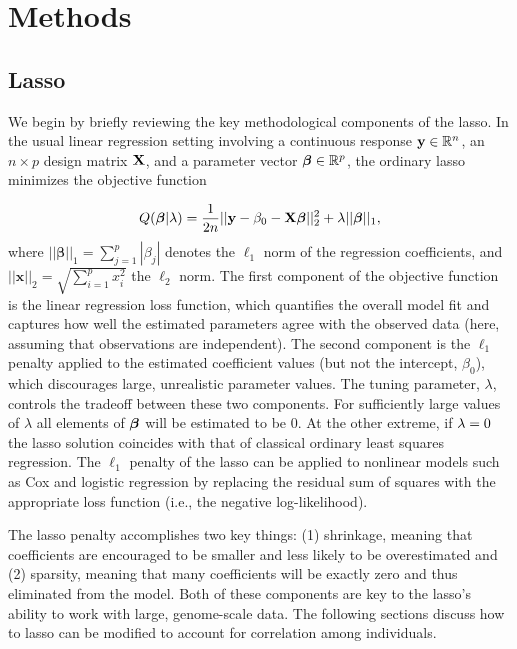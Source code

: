\section{Methods} \label{sec:methods}
\subsection{Lasso}
We begin by briefly reviewing the key methodological components of the lasso. In the usual linear regression setting involving a continuous response $\mathbf{y} \in \mathbb{R}^n$, an $n \times p$ design matrix $\mathbf{X}$, and a parameter vector $\boldsymbol{\beta}{} \in \mathbb{R}^p$, the ordinary lasso minimizes the objective function

\begin{equation}
    Q(\boldsymbol{\beta}{} | \lambda) = \frac{1}{2n}|| \mathbf{y} -  \beta_0 - \mathbf{X} \boldsymbol{\beta}{} ||_2^2 + \lambda ||\boldsymbol{\beta}{}||_1,
\end{equation}
where $|| \boldsymbol{\beta} ||_1 = \sum_{j=1}^p |\beta_j|$ denotes the $\ell_1$ norm of the regression coefficients, and $||\mathbf{x}||_2 = \sqrt{\sum_{i=1}^p x_i^2}$ the $\ell_2$ norm. The first component of the objective function is the linear regression loss function, which quantifies the overall model fit and captures how well the estimated parameters agree with the observed data (here, assuming that observations are independent). The second component is the $\ell_1$ penalty applied to the estimated coefficient values (but not the intercept, $\beta_0$), which discourages large, unrealistic parameter values. The tuning parameter, $\lambda$, controls the tradeoff between these two components. For sufficiently large values of $\lambda$ all elements of $\boldsymbol{\beta}{}$ will be estimated to be 0. At the other extreme, if $\lambda = 0$ the lasso solution coincides with that of classical ordinary least squares regression. The $\ell_1$ penalty of the lasso can be applied to nonlinear models such as Cox and logistic regression \citep{tibshirani1997lasso, friedman2001elements, shevade2003simple} by replacing the residual sum of squares with the appropriate loss function (i.e., the negative log-likelihood).

The lasso penalty accomplishes two key things: (1) shrinkage, meaning that coefficients are encouraged to be smaller and less likely to be overestimated and (2) sparsity, meaning that many coefficients will be exactly zero and thus eliminated from the model. Both of these components are key to the lasso's ability to work with large, genome-scale data. The following sections discuss how to lasso can be modified to account for correlation among individuals.

